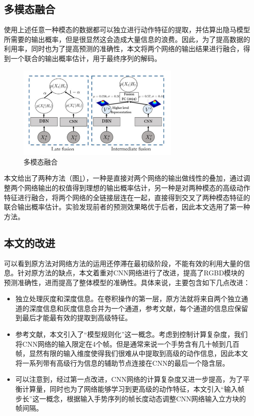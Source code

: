 \documentclass[a4paper, 12pt]{article}
\begin{document}
\subsection{多模态融合}
使用上述任意一种模态的数据都可以独立进行动作特征的提取，并估算出隐马模型所需要的输出概率，但是很显然这会造成大量信息的浪费。因此，为了提高数据的利用率，同时也为了提高预测的准确性，本文将两个网络的输出结果进行融合，得到一个联合的输出概率估计，用于最终序列的解码。

\begin{figure}[ht]
  \centering
  \includegraphics[width=8cm]{fusion.png}
  \caption{\label{fig:4}多模态融合}
\end{figure}

本文给出了两种方法（图\ref{fig:4}），一种是直接对两个网络的输出做线性的叠加，通过调整两个网络输出的权值得到理想的输出概率估计，另一种是对两种模态的高级动作特征进行融合，将两个网络的全链接层连在一起，直接得到交叉了两种模态特征的联合输出概率估计。实验发现前者的预测效果略优于后者，因此本文选用了第一种方法。

\subsection{本文的改进}
可以看到原方法对网络方法的运用还停滞在最初级阶段，不能有效的利用大量的信息。针对原方法的缺点，本文着重对CNN网络进行了改进，提高了RGBD模块的预测准确性，进而提高了整体模型的准确性。具体来说，主要包含如下几点改进：

\begin{itemize}
\item 独立处理灰度和深度信息。在卷积操作的第一层，原方法就将来自两个独立通道的深度信息和灰度信息合并为一个通道，参考文献\cite{p5}，每个通道的信息应保留到最后才能最有效的提取到高级特征。
\item
参考文献\cite{p3}，本文引入了“模型规则化”这一概念。考虑到控制计算复杂度，我们将CNN网络的输入限定在4个帧。但是通常来说一个手势含有几十帧到几百帧，显然有限的输入维度使得我们很难从中提取到高级的动作信息，因此本文将一系列带有高级行为信息的辅助节点连接在CNN的最后一个隐含层。
\item 可以注意到，经过第一点改进，CNN网络的计算复杂度又进一步提高，为了平衡计算量，同时也为了网络能够学习到更高级的动作特征，本文引入“输入帧步长”这一概念，根据输入手势序列的帧长度动态调整CNN网络输入立方块的帧间隔。
\end{itemize}
\end{document}

